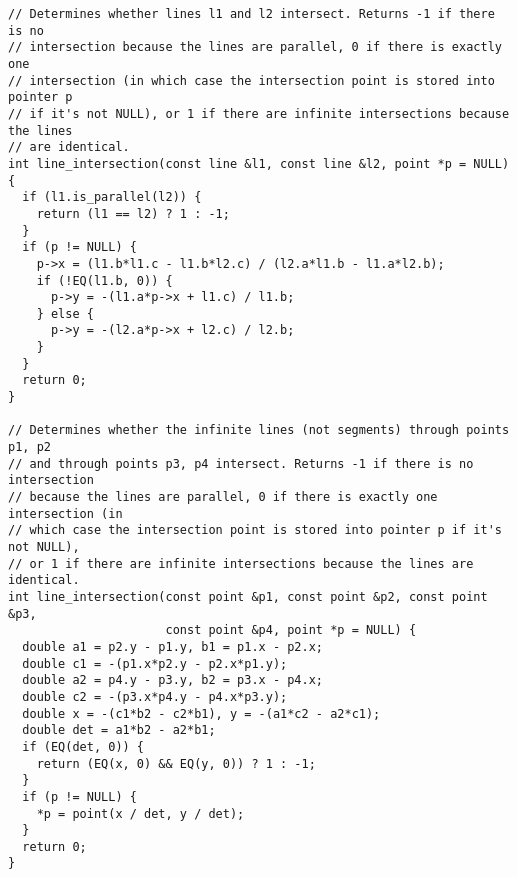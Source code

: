 \begin{lstlisting}
// Determines whether lines l1 and l2 intersect. Returns -1 if there is no
// intersection because the lines are parallel, 0 if there is exactly one
// intersection (in which case the intersection point is stored into pointer p
// if it's not NULL), or 1 if there are infinite intersections because the lines
// are identical.
int line_intersection(const line &l1, const line &l2, point *p = NULL) {
  if (l1.is_parallel(l2)) {
    return (l1 == l2) ? 1 : -1;
  }
  if (p != NULL) {
    p->x = (l1.b*l1.c - l1.b*l2.c) / (l2.a*l1.b - l1.a*l2.b);
    if (!EQ(l1.b, 0)) {
      p->y = -(l1.a*p->x + l1.c) / l1.b;
    } else {
      p->y = -(l2.a*p->x + l2.c) / l2.b;
    }
  }
  return 0;
}

// Determines whether the infinite lines (not segments) through points p1, p2
// and through points p3, p4 intersect. Returns -1 if there is no intersection
// because the lines are parallel, 0 if there is exactly one intersection (in
// which case the intersection point is stored into pointer p if it's not NULL),
// or 1 if there are infinite intersections because the lines are identical.
int line_intersection(const point &p1, const point &p2, const point &p3,
                      const point &p4, point *p = NULL) {
  double a1 = p2.y - p1.y, b1 = p1.x - p2.x;
  double c1 = -(p1.x*p2.y - p2.x*p1.y);
  double a2 = p4.y - p3.y, b2 = p3.x - p4.x;
  double c2 = -(p3.x*p4.y - p4.x*p3.y);
  double x = -(c1*b2 - c2*b1), y = -(a1*c2 - a2*c1);
  double det = a1*b2 - a2*b1;
  if (EQ(det, 0)) {
    return (EQ(x, 0) && EQ(y, 0)) ? 1 : -1;
  }
  if (p != NULL) {
    *p = point(x / det, y / det);
  }
  return 0;
}


\end{lstlisting}
